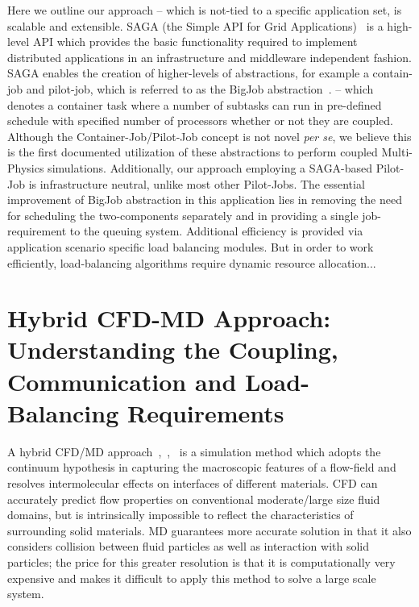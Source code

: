 \documentclass[conference,final]{IEEEtran}
\begin{document}
Here we outline our approach -- which is not-tied to a specific application set, is 
scalable and extensible. SAGA (the Simple API for Grid Applications)~\cite{saga_web} is 
a high-level API which provides the basic functionality required to implement distributed 
applications in an infrastructure and middleware independent fashion. SAGA enables the 
creation of higher-levels of abstractions, for example a contain-job and pilot-job, which 
is referred to as the BigJob abstraction~\cite{saga_royalsoc}. -- which denotes a 
container task where a number of subtasks can run in pre-defined schedule with specified 
number of processors whether or not they are coupled. Although the 
Container-Job/Pilot-Job concept is not novel {\it per se}, we believe this is the first 
documented utilization of these abstractions to perform coupled Multi-Physics 
simulations. Additionally, our approach employing a SAGA-based Pilot-Job is 
infrastructure neutral, unlike most other Pilot-Jobs. The essential improvement of 
BigJob abstraction in this application lies in removing the need for scheduling the 
two-components separately and in providing a single job-requirement to the queuing 
system. Additional efficiency is provided via application scenario specific load 
balancing modules. But in order to work efficiently, load-balancing algorithms require 
dynamic resource allocation...

\section{Hybrid CFD-MD Approach: Understanding the Coupling, Communication and 
Load-Balancing Requirements}

A hybrid CFD/MD approach~\cite{Thompson},~\cite{Nie},~\cite{Yen} is a simulation method 
which adopts the continuum hypothesis in capturing the macroscopic features of a 
flow-field and resolves intermolecular effects on interfaces of different materials. CFD 
can accurately predict flow properties on conventional moderate/large size fluid domains, 
but is intrinsically impossible to reflect the characteristics of surrounding solid 
materials. MD guarantees more accurate solution in that it also considers collision 
between fluid particles as well as interaction with solid particles; the price for this 
greater resolution is that it is computationally very expensive and makes it difficult to 
apply this method to solve a large scale system.
\end{document}
